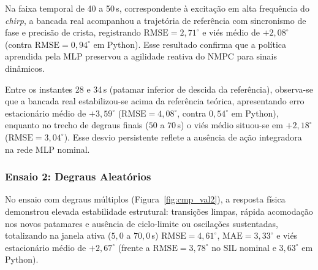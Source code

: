 Na faixa temporal de 40 a 50\,s, correspondente à excitação em alta frequência do \textit{chirp}, a bancada real acompanhou a trajetória de referência com sincronismo de fase e precisão de crista, registrando $\text{RMSE} = 2{,}71^\circ$ e viés médio de $+2{,}08^\circ$ (contra $\text{RMSE} = 0{,}94^\circ$ em Python). Esse resultado confirma que a política aprendida pela MLP preservou a agilidade reativa do NMPC para sinais dinâmicos.

Entre os instantes 28 e 34\,s (patamar inferior de descida da referência), observa-se que a bancada real estabilizou-se acima da referência teórica, apresentando erro estacionário médio de $+3{,}59^\circ$ ($\text{RMSE} = 4{,}08^\circ$, contra $0{,}54^\circ$ em Python), enquanto no trecho de degraus finais ($50$ a $70$\,s) o viés médio situou-se em $+2{,}18^\circ$ ($\text{RMSE} = 3{,}04^\circ$). Esse desvio persistente reflete a ausência de ação integradora na rede MLP nominal.

\subsubsection{Ensaio 2: Degraus Aleatórios}
No ensaio com degraus múltiplos (Figura~\ref{fig:cmp_val2}), a resposta física demonstrou elevada estabilidade estrutural: transições limpas, rápida acomodação nos novos patamares e ausência de ciclo-limite ou oscilações sustentadas, totalizando na janela ativa ($5{,}0$ a $70{,}0$\,s) $\text{RMSE} = 4{,}61^\circ$, $\text{MAE} = 3{,}33^\circ$ e viés estacionário médio de $+2{,}67^\circ$ (frente a $\text{RMSE} = 3{,}78^\circ$ no SIL nominal e $3{,}63^\circ$ em Python).

